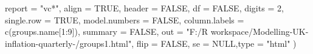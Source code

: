 \documentclass[
]{article}
\newenvironment{Shaded}{\begin{snugshade}}{\end{snugshade}}
\newcommand{\AttributeTok}[1]{\textcolor[rgb]{0.77,0.63,0.00}{#1}}
\newcommand{\ConstantTok}[1]{\textcolor[rgb]{0.00,0.00,0.00}{#1}}
\newcommand{\DecValTok}[1]{\textcolor[rgb]{0.00,0.00,0.81}{#1}}
\newcommand{\FunctionTok}[1]{\textcolor[rgb]{0.00,0.00,0.00}{#1}}
\newcommand{\NormalTok}[1]{#1}
\newcommand{\SpecialCharTok}[1]{\textcolor[rgb]{0.00,0.00,0.00}{#1}}
\newcommand{\StringTok}[1]{\textcolor[rgb]{0.31,0.60,0.02}{#1}}
\begin{document}
\begin{Shaded}
\begin{Highlighting}[]
          \AttributeTok{report =} \StringTok{"vc*"}\NormalTok{,}
          \AttributeTok{align =} \ConstantTok{TRUE}\NormalTok{,}
          \AttributeTok{header =} \ConstantTok{FALSE}\NormalTok{,}
          \AttributeTok{df =} \ConstantTok{FALSE}\NormalTok{,}
          \AttributeTok{digits =} \DecValTok{2}\NormalTok{, }\AttributeTok{single.row =} \ConstantTok{TRUE}\NormalTok{,}
          \AttributeTok{model.numbers =} \ConstantTok{FALSE}\NormalTok{,}
          \AttributeTok{column.labels =} \FunctionTok{c}\NormalTok{(groups.name[}\DecValTok{1}\SpecialCharTok{:}\DecValTok{9}\NormalTok{]),}
          \AttributeTok{summary =} \ConstantTok{FALSE}\NormalTok{,}
          \AttributeTok{out =} \StringTok{"F:/R workspace/Modelling{-}UK{-}inflation{-}quarterly{-}/groups1.html"}\NormalTok{,}
          \AttributeTok{flip =} \ConstantTok{FALSE}\NormalTok{,}
          \AttributeTok{se =} \ConstantTok{NULL}\NormalTok{,}\AttributeTok{type =} \StringTok{"html"}
\NormalTok{)}
\end{Highlighting}
\end{Shaded}
\end{document}
